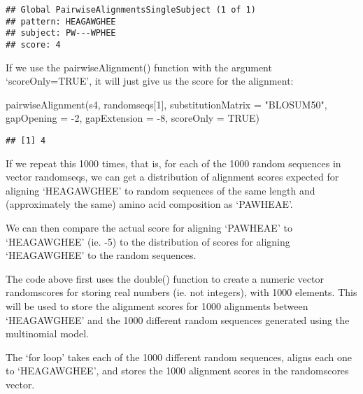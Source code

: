 \documentclass[
]{book}
\newenvironment{Shaded}{\begin{snugshade}}{\end{snugshade}}
\newcommand{\AttributeTok}[1]{\textcolor[rgb]{0.77,0.63,0.00}{#1}}
\newcommand{\ConstantTok}[1]{\textcolor[rgb]{0.00,0.00,0.00}{#1}}
\newcommand{\DecValTok}[1]{\textcolor[rgb]{0.00,0.00,0.81}{#1}}
\newcommand{\FunctionTok}[1]{\textcolor[rgb]{0.00,0.00,0.00}{#1}}
\newcommand{\NormalTok}[1]{#1}
\newcommand{\SpecialCharTok}[1]{\textcolor[rgb]{0.00,0.00,0.00}{#1}}
\newcommand{\StringTok}[1]{\textcolor[rgb]{0.31,0.60,0.02}{#1}}
\begin{document}
\begin{verbatim}
## Global PairwiseAlignmentsSingleSubject (1 of 1)
## pattern: HEAGAWGHEE
## subject: PW---WPHEE
## score: 4
\end{verbatim}

If we use the pairwiseAlignment() function with the argument `scoreOnly=TRUE', it will just give us the score for the alignment:

\begin{Shaded}
\begin{Highlighting}[]
\FunctionTok{pairwiseAlignment}\NormalTok{(s4, randomseqs[}\DecValTok{1}\NormalTok{], }\AttributeTok{substitutionMatrix =} \StringTok{"BLOSUM50"}\NormalTok{, }\AttributeTok{gapOpening =} \SpecialCharTok{{-}}\DecValTok{2}\NormalTok{,}
  \AttributeTok{gapExtension =} \SpecialCharTok{{-}}\DecValTok{8}\NormalTok{, }\AttributeTok{scoreOnly =} \ConstantTok{TRUE}\NormalTok{)}
\end{Highlighting}
\end{Shaded}

\begin{verbatim}
## [1] 4
\end{verbatim}

If we repeat this 1000 times, that is, for each of the 1000 random sequences in vector randomseqs, we can get a distribution of alignment scores expected for aligning `HEAGAWGHEE' to random sequences of the same length and (approximately the same) amino acid composition as `PAWHEAE'.

We can then compare the actual score for aligning `PAWHEAE' to `HEAGAWGHEE' (ie. -5) to the distribution of scores for aligning `HEAGAWGHEE' to the random sequences.

The code above first uses the double() function to create a numeric vector randomscores for storing real numbers (ie. not integers), with 1000 elements. This will be used to store the alignment scores for 1000 alignments between `HEAGAWGHEE' and the 1000 different random sequences generated using the multinomial model.

The `for loop' takes each of the 1000 different random sequences, aligns each one to `HEAGAWGHEE', and stores the 1000 alignment scores in the randomscores vector.
\end{document}
